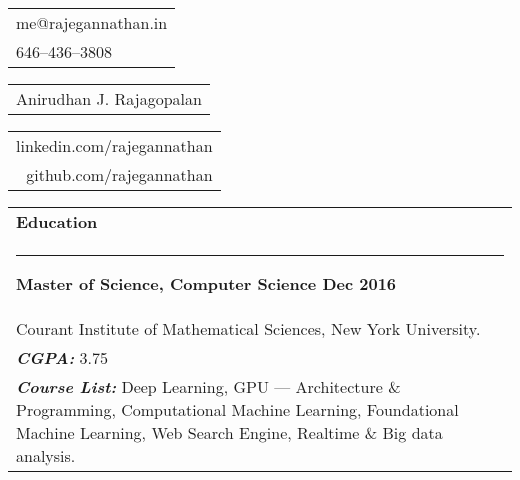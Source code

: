 \documentclass{article}
\begin{document}
{\small\begin{tabular}[c]{l}
        me@rajegannathan.in \\
        646--436--3808
\end{tabular}}\hfill%
{\Large\bfseries\begin{tabular}[c]{c}
        Anirudhan J. Rajagopalan
\end{tabular}}\hfill%
{\small\begin{tabular}[c]{r}
        linkedin.com/rajegannathan \\
        github.com/rajegannathan
\end{tabular}}%


\bigskip

\begin{tabular}{p{\dimexpr\linewidth-2\tabcolsep}}
    \textbf{\large{Education}} \\
    \noindent\rule{\textwidth}{0.4pt}
    {\bfseries Master of Science, Computer Science \hfill Dec 2016} \\
    \quad Courant Institute of Mathematical Sciences, New York University.\\
    \quad \textbf{\textit{CGPA:}} 3.75 \\
    \quad \textbf{\textit{Course List:}} Deep Learning, GPU --- Architecture \& Programming, Computational Machine Learning, Foundational Machine Learning, Web Search Engine, Realtime \& Big data analysis.
\end{tabular}

\bigskip
\end{document}
